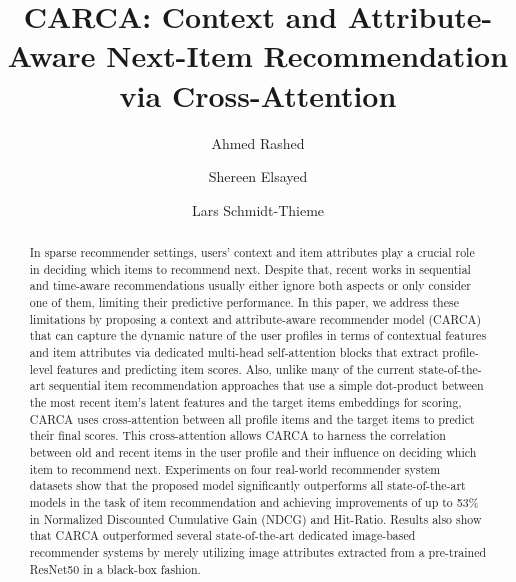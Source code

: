 \documentclass[sigconf,natbib=true]{acmart}
\begin{document}
\title{CARCA: Context and Attribute-Aware Next-Item Recommendation via Cross-Attention}




\author{Ahmed Rashed}
\orcid{}
\author{Shereen Elsayed}

\author{Lars Schmidt-Thieme}


\renewcommand{\shortauthors}{Rashed, et al.}

\begin{abstract}
In sparse recommender settings, users' context and item attributes play a crucial role in deciding which items to recommend next. Despite that, recent works in sequential and time-aware recommendations usually either ignore both aspects or only consider one of them, limiting their predictive performance. In this paper, we address these limitations by proposing a context and attribute-aware recommender model (CARCA) that can capture the dynamic nature of the user profiles in terms of contextual features and item attributes via dedicated multi-head self-attention blocks that extract profile-level features and predicting item scores. Also, unlike many of the current state-of-the-art sequential item recommendation approaches that use a simple dot-product between the most recent item's latent features and the target items embeddings for scoring, CARCA uses cross-attention between all profile items and the target items to predict their final scores. This cross-attention allows CARCA to harness the correlation between old and recent items in the user profile and their influence on deciding which item to recommend next. Experiments on four real-world recommender system datasets show that the proposed model significantly outperforms all state-of-the-art models in the task of item recommendation and achieving improvements of up to 53\% in Normalized Discounted Cumulative Gain (NDCG) and Hit-Ratio. Results also show that CARCA outperformed several state-of-the-art dedicated image-based recommender systems by merely utilizing image attributes extracted from a pre-trained ResNet50 in a black-box fashion.
\end{abstract}
\end{document}
